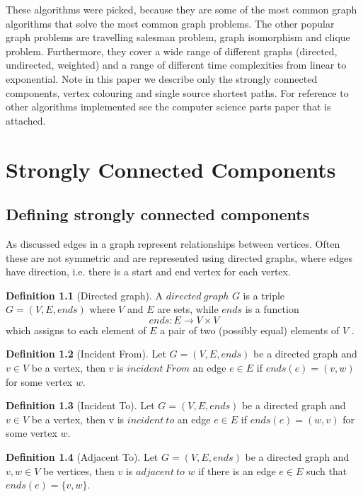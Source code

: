 \documentclass{report}
\theoremstyle{plain}
\theoremstyle{definition}
\newtheorem{definition}{Definition}
\theoremstyle{remark}
\numberwithin{definition}{chapter}
\numberwithin{example}{chapter}
\numberwithin{figure}{chapter}
\begin{document}
These algorithms were picked, because they are some of the most common graph algorithms that solve the most common graph problems. The other popular graph problems are travelling salesman problem, graph isomorphism and clique problem. Furthermore, they cover a wide range of different graphs (directed, undirected, weighted) and a range of different time complexities from linear to exponential. Note in this paper we describe only the strongly connected components, vertex colouring and single source shortest paths. For reference to other algorithms implemented see the computer science parts paper that is attached.

\chapter{Strongly Connected Components}

\section{Defining strongly connected components}

As discussed edges in a graph represent relationships between vertices. Often these are not symmetric and are represented using directed graphs, where edges have direction, i.e. there is a start and end vertex for each vertex.

\begin{definition}[Directed graph]
A $directed \ graph$  $G$ is a triple $G = (V, E, ends)$ where $V$ and $E$ are sets, while $ends$ is a function 
  \begin{equation}
  ends:E\to V \times V
  \end{equation}
which assigns to each element of $E$ a pair of two (possibly equal) elements of $V$ .
\end{definition}

\begin{definition}[Incident From]
Let $G = (V, E, ends)$ be a directed graph and $v \in V$ be a vertex, then $v$ is $incident \ From$ an edge $e \in E$ if $ends(e)=(v, w)$ for some vertex $w$.
\end{definition}

\begin{definition}[Incident To]
Let $G = (V, E, ends)$ be a directed graph and $v \in V$ be a vertex, then v is $incident \ to$ an edge $e \in E$ if $ends(e)=(w, v)$ for some vertex $w$.
\end{definition}

\begin{definition}[Adjacent To]
Let $G = (V, E, ends)$ be a directed graph and $v,w\in V$ be vertices, then $v$ is $adjacent \ to$ $w$ if there is an edge $ e \in E$ such that $ends(e) = \{v, w\}$.
\end{definition}
\end{document}
